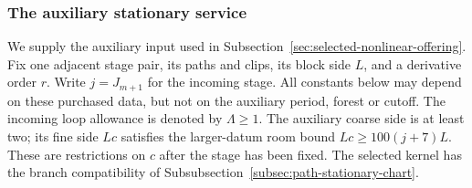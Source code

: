 \subsubsection{The auxiliary stationary service}

We supply the auxiliary input used in
Subsection~\ref{sec:selected-nonlinear-offering}. Fix one adjacent stage
pair, its paths and clips, its block side $L$, and a derivative order
$r$. Write $j=J_{m+1}$ for the incoming stage. All constants below may depend on these purchased data, but not
on the auxiliary period, forest or cutoff. The incoming loop allowance
is denoted by $\Lambda\ge1$. The auxiliary coarse side is at least two;
its fine side $Lc$ satisfies the larger-datum room bound
$Lc\ge100(j+7)L$. These are restrictions on $c$ after the stage
has been fixed. The selected kernel has the branch compatibility of
Subsubsection~\ref{subsec:path-stationary-chart}.

